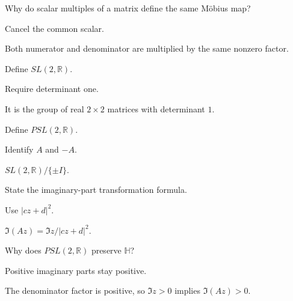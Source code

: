 \begin{exercise}\label{exr:vii33-02}
Why do scalar multiples of a matrix define the same Möbius map?
\end{exercise}
\begin{hint}
Cancel the common scalar.
\end{hint}
\begin{solution}
Both numerator and denominator are multiplied by the same nonzero factor.
\end{solution}

\begin{exercise}\label{exr:vii33-03}
Define \(SL(2,\mathbb R)\).
\end{exercise}
\begin{hint}
Require determinant one.
\end{hint}
\begin{solution}
It is the group of real \(2\times2\) matrices with determinant \(1\).
\end{solution}

\begin{exercise}\label{exr:vii33-04}
Define \(PSL(2,\mathbb R)\).
\end{exercise}
\begin{hint}
Identify \(A\) and \(-A\).
\end{hint}
\begin{solution}
\(SL(2,\mathbb R)/\{\pm I\}\).
\end{solution}

\begin{exercise}\label{exr:vii33-05}
State the imaginary-part transformation formula.
\end{exercise}
\begin{hint}
Use \(|cz+d|^2\).
\end{hint}
\begin{solution}
\(\Im(Az)=\Im z/|cz+d|^2\).
\end{solution}

\begin{exercise}\label{exr:vii33-06}
Why does \(PSL(2,\mathbb R)\) preserve \(\mathbb H\)?
\end{exercise}
\begin{hint}
Positive imaginary parts stay positive.
\end{hint}
\begin{solution}
The denominator factor is positive, so \(\Im z>0\) implies \(\Im(Az)>0\).
\end{solution}

